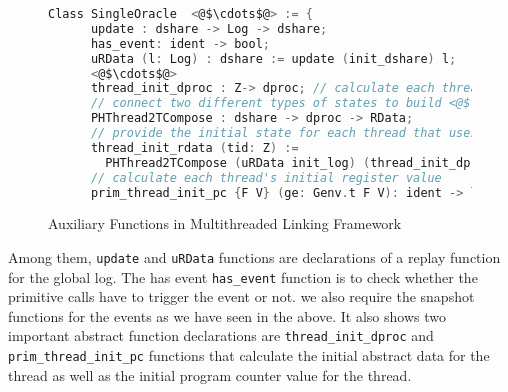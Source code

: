 \begin{figure}
\begin{lstlisting}[language=C, morekeywords={Class}]
  Class SingleOracle  <@$\cdots$@> := {
      update : dshare -> Log -> dshare;
      has_event: ident -> bool;      
      uRData (l: Log) : dshare := update (init_dshare) l;
      <@$\cdots$@>
      thread_init_dproc : Z-> dproc; // calculate each thread's initial private state
      // connect two different types of states to build <@$\color{red} \hasmmach$@>
      PHThread2TCompose : dshare -> dproc -> RData; 
      // provide the initial state for each thread that uses  <@$\color{red} \hasmmach$@>
      thread_init_rdata (tid: Z) :=
        PHThread2TCompose (uRData init_log) (thread_init_dproc tid);
      // calculate each thread's initial register value
      prim_thread_init_pc {F V} (ge: Genv.t F V): ident -> list lval -> option val }.
\end{lstlisting}
\caption{Auxiliary Functions in Multithreaded Linking Framework}
\label{fig:chapter:conlink:multithreaded-linking-aux-functions}
\end{figure}
Among them,  \lstinline$update$ and \lstinline$uRData$ functions are  declarations of a replay function for the global log. 
The has event \lstinline$has_event$ function is to check whether the primitive calls have to trigger the event or not. 
we also require the snapshot functions for the events as we have seen in the above.
It also shows two important abstract function declarations 
are \lstinline$thread_init_dproc$ and \lstinline$prim_thread_init_pc$ functions 
that calculate the initial abstract data for the thread as well as the initial program counter value 
for the thread. 

